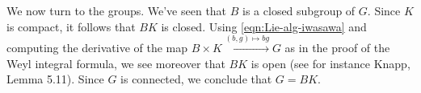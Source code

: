 \documentclass[reqno]{amsart} 
\begin{document}
We now turn to the groups.  We've seen that $B$ is a closed subgroup of $G$.  Since $K$ is compact, it follows that $B K$ is closed.  Using \eqref{eqn:Lie-alg-iwasawa} and computing the derivative of the map $B \times K \xrightarrow{(b,g) \mapsto b g } G$ as in the proof of the Weyl integral formula, we see moreover that $B K$ is open (see for instance Knapp, Lemma 5.11).  Since $G$ is connected, we conclude that $G = B K$.






\end{document}
